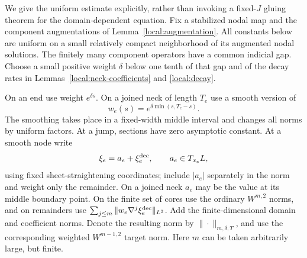 \documentclass[11pt]{article}
\theoremstyle{definition}
\theoremstyle{remark}
\numberwithin{equation}{section}
\begin{document}
We give the uniform estimate explicitly, rather than invoking a fixed-$J$
gluing theorem for the domain-dependent equation.  Fix a stabilized nodal
map and the component augmentations of Lemma~\ref{local:augmentation}.
All constants below are uniform on a small relatively compact neighborhood
of its augmented nodal solutions.  The finitely many component operators
have a common indicial gap.  Choose a small positive weight $\delta$ below
one tenth of that gap and of the decay rates in
Lemmas~\ref{local:neck-coefficients} and \ref{local:decay}.

On an end use weight $e^{\delta s}$.  On a joined neck of length $T_e$
use a smooth version of
\begin{equation}\label{local:weight-function}
 w_e(s)=e^{\delta\min(s,T_e-s)}.
\end{equation}
The smoothing takes place in a fixed-width middle interval and changes
all norms by uniform factors.  At a jump, sections have zero asymptotic
constant.  At a smooth node write
\[
 \xi_e=a_e+\xi_e^{\rm dec},\qquad a_e\in T_{x_e}L,
\]
using fixed sheet-straightening coordinates; include $|a_e|$ separately
in the norm and weight only the remainder.  On a joined neck $a_e$ may
be the value at its middle boundary point.  On the finite set of cores
use the ordinary $W^{m,2}$ norms, and on remainders use
$\sum_{j\leq m}\|w_e\nabla^j\xi_e^{\rm dec}\|_{L^2}$.
Add the finite-dimensional domain and coefficient norms.  Denote the
resulting norm by $\|\cdot\|_{m,\delta,T}$, and use the corresponding
weighted $W^{m-1,2}$ target norm.  Here $m$ can be taken arbitrarily
large, but finite.
\end{document}
